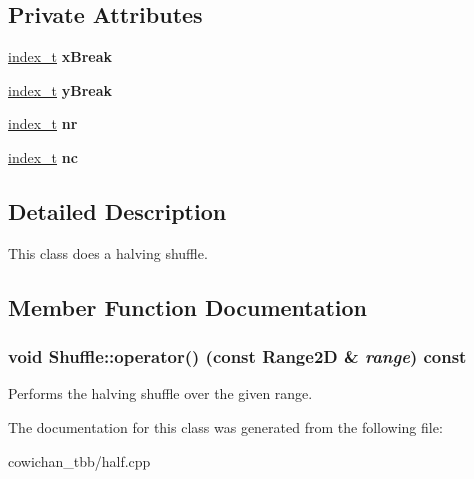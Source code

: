 \subsection*{Private Attributes}
\begin{CompactItemize}
\item 
\hypertarget{class_shuffle_d8f6038cc7fd4f722d7f00f2a6af9698}{
\hyperlink{cowichan_8hpp_5b04577d5d21124855deaad298595371}{index\_\-t} \textbf{xBreak}}
\label{class_shuffle_d8f6038cc7fd4f722d7f00f2a6af9698}

\item 
\hypertarget{class_shuffle_a41b51804d77e262d65fc79474879e9c}{
\hyperlink{cowichan_8hpp_5b04577d5d21124855deaad298595371}{index\_\-t} \textbf{yBreak}}
\label{class_shuffle_a41b51804d77e262d65fc79474879e9c}

\item 
\hypertarget{class_shuffle_d685d43331c6f9a9d0f0775d8e21ebff}{
\hyperlink{cowichan_8hpp_5b04577d5d21124855deaad298595371}{index\_\-t} \textbf{nr}}
\label{class_shuffle_d685d43331c6f9a9d0f0775d8e21ebff}

\item 
\hypertarget{class_shuffle_c7f2688b41a3bc24e7939164a28784e0}{
\hyperlink{cowichan_8hpp_5b04577d5d21124855deaad298595371}{index\_\-t} \textbf{nc}}
\label{class_shuffle_c7f2688b41a3bc24e7939164a28784e0}

\end{CompactItemize}


\subsection{Detailed Description}
This class does a halving shuffle. 

\subsection{Member Function Documentation}
\hypertarget{class_shuffle_7922aacb5aae207d2e51ded86b3c1c9d}{
\subsubsection[{operator()}]{\setlength{\rightskip}{0pt plus 5cm}void Shuffle::operator() (const {\bf Range2D} \& {\em range}) const}}
\label{class_shuffle_7922aacb5aae207d2e51ded86b3c1c9d}


Performs the halving shuffle over the given range. 

The documentation for this class was generated from the following file:\begin{CompactItemize}
\item 
cowichan\_\-tbb/half.cpp\end{CompactItemize}
